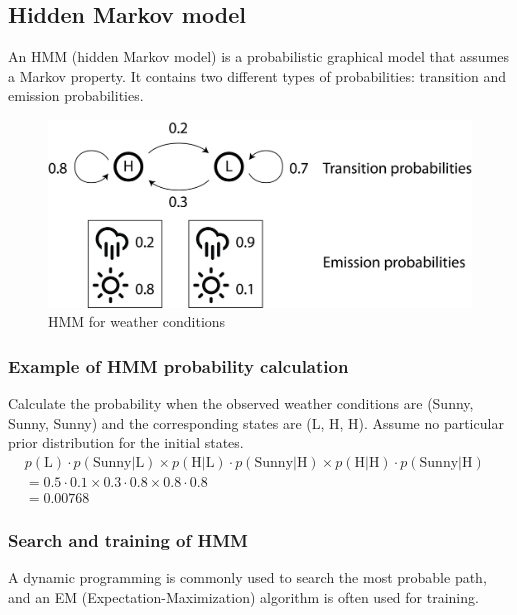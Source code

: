 %
%

%
%
\subsection{Hidden Markov model}
An HMM (hidden Markov model) is a probabilistic graphical model that assumes a Markov property. It contains two different types of probabilities: transition and emission probabilities.

\begin{figure}[H]
  \centering
      \includegraphics[width=0.5 \textwidth]{fig13/HMM_example.png}
  \caption{HMM for weather conditions}
\end{figure}

%
%
\subsubsection*{Example of HMM probability calculation}
Calculate the probability when the observed weather conditions are (Sunny, Sunny, Sunny) and the corresponding states are (L, H, H). Assume no particular prior distribution for the initial states. \\

$\begin{aligned}
&p(\mathrm{L}) \cdot  p(\mathrm{Sunny}|\mathrm{L}) 
\times p(\mathrm{H}|\mathrm{L}) \cdot  p(\mathrm{Sunny}|\mathrm{H}) 
\times p(\mathrm{H}|\mathrm{H}) \cdot  p(\mathrm{Sunny}|\mathrm{H}) \\
&= 0.5 \cdot 0.1 \times 0.3 \cdot 0.8 \times 0.8 \cdot 0.8 \\
&= 0.00768
\end{aligned} $

%
%
\subsubsection*{Search and training of HMM}
A dynamic programming is commonly used to search the most probable path, and an EM (Expectation-Maximization) algorithm is often used for training.

